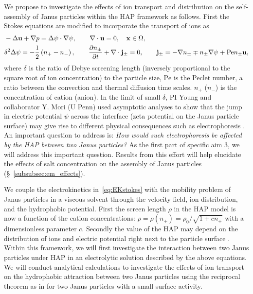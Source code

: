 We propose to investigate the effects of ion transport and distribution on the self-assembly of Janus particles within the HAP framework as follows.
First the Stokes equations are modified to incorporate the transport of ions as
\begin{equation}
\label{eq:EKstokes}
\begin{aligned}
  &-\Delta \mathbf{u} + \nabla p = \Delta\psi\cdot\nabla\psi, \qquad
  \nabla \cdot \mathbf{u} = 0,  \quad \mathbf{x} \in \Omega,\\
  &\delta^2\Delta\psi = -\frac{1}{2}\left(n_+-n_-\right),\qquad
  \frac{\partial n_{\pm}}{\partial t} + \nabla\cdot{\bf j}_{\pm} = 0,\qquad {\bf j}_{\pm} = -\nabla n_{\pm} \mp n_{\pm} \nabla\psi + \mbox{Pe} n_{\pm}\mathbf{u},
\end{aligned}
\end{equation}
where $\delta$ is the ratio of Debye screening length (inversely proportional to the square root of
ion concentration) to the particle size, 
$\mbox{Pe}$ is the Peclet number, a ratio between the convection and  thermal diffusion time scales.
$n_{+}$ ($n_{-}$) is the concentration of cation (anion).  In the limit of small $\delta$, PI Young and collaborator Y. Mori (U Penn) used asymptotic analyses to show that the jump in electric potential $\psi$ across the interface (zeta potential on the Janus particle surface) 
may give rise to different physical consequences such as electrophoresis \cite{Mori2018_JFM}.
%
An important question to address is: {\it How would such electrophoresis be affected by the HAP between two Janus particles?} 
As the first part of specific aim 3, we will address this important question. Results from this effort will help elucidate the effects of salt concentration on the assembly of Janus particles (\S~\ref{subsubsec:em_effects}).

We couple the electrokinetics in~\eqref{eq:EKstokes} with the mobility  problem of Janus particles in a viscous solvent through the velocity field, ion distribution, and the hydrophobic potential.  
First the screen length $\rho$ in the HAP model is now a function of the  cation concentrations: $\rho = \rho(n_+) =
\rho_0/\sqrt{1+c n_+}$ with a dimensionless parameter $c$. 
%
Secondly the value of the HAP may depend on the distribution of ions and electric potential right next to the particle surface \cite{Mori2018_JFM}.
Within this framework, we will first investigate the interaction between two Janus particles under HAP in an electrolytic solution described by the above
equations. We will conduct analytical calculations to investigate the effects of ion transport on the hydrophobic attraction between two Janus particles using the reciprocal theorem as in \cite{BayatiNajafi2016_JCP} for two Janus particles with a small surface activity.



